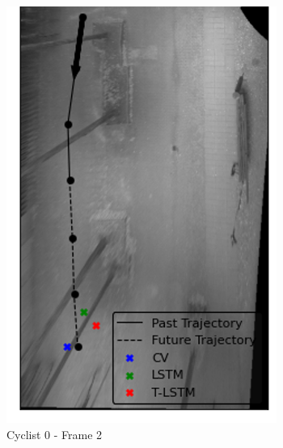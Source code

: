 \documentclass{article}
\begin{document}
\begin{figure}[H]
\begin{subfigure}{0.4\textwidth}
  \includegraphics[width=\linewidth]{quali_results/cyc-0-2.png}
  \caption{Cyclist 0 - Frame 2}
  \label{fig:cyc0-2}
\end{subfigure}
\begin{subfigure}{0.40\textwidth}
  \centering

\end{subfigure}
\end{figure}
\end{document}
